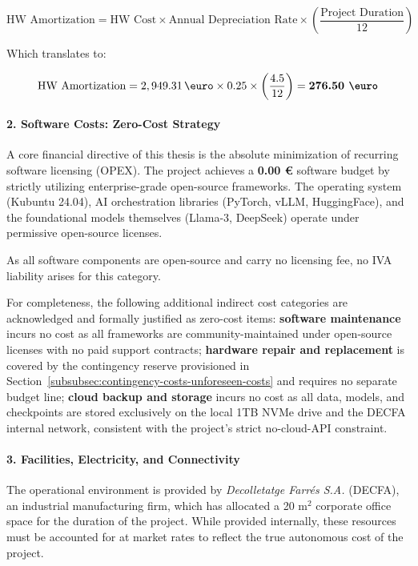 \begin{equation}
\text{HW Amortization} = \text{HW Cost} \times \text{Annual Depreciation Rate} \times \left( \frac{\text{Project Duration}}{12} \right)
\end{equation}

Which translates to:

\begin{equation}
\text{HW Amortization} = 2,949.31 \, \text{\euro} \times 0.25 \times \left( \frac{4.5}{12} \right) = \textbf{276.50 \euro}
\end{equation}


\paragraph{2. Software Costs: Zero-Cost Strategy}
A core financial directive of this thesis is the absolute minimization of recurring software licensing (OPEX). The project achieves a \textbf{0.00 €} software budget by strictly utilizing enterprise-grade open-source frameworks. The operating system (Kubuntu 24.04), AI orchestration libraries (PyTorch, vLLM, HuggingFace), and the foundational models themselves (Llama-3, DeepSeek) operate under permissive open-source licenses. 

As all software components are open-source and carry no licensing
fee, no IVA liability arises for this category.

For completeness, the following additional indirect cost categories are
acknowledged and formally justified as zero-cost items: \textbf{software
maintenance} incurs no cost as all frameworks are community-maintained
under open-source licenses with no paid support contracts;
\textbf{hardware repair and replacement} is covered by the contingency
reserve provisioned in Section~\ref{subsubsec:contingency-costs-unforeseen-costs}
and requires no separate budget line; \textbf{cloud backup and storage}
incurs no cost as all data, models, and checkpoints are stored exclusively
on the local 1TB NVMe drive and the DECFA internal network, consistent
with the project's strict no-cloud-API constraint.

\paragraph{3. Facilities, Electricity, and Connectivity}
The operational environment is provided by \textit{Decolletatge Farrés S.A.} (DECFA), an industrial manufacturing firm, which has allocated a 20 $\text{m}^2$ corporate office space for the duration of the project. While provided internally, these resources must be accounted for at market rates to reflect the true autonomous cost of the project.

